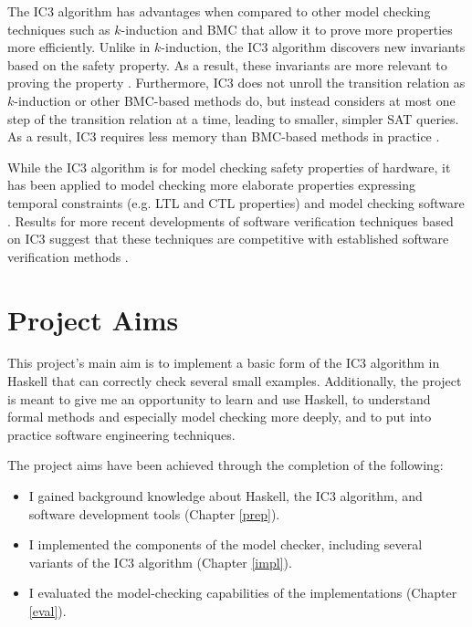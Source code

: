 \documentclass[12pt,a4paper,twoside,openright]{report}
\begin{document}
The IC3 algorithm has advantages when compared to other model checking
techniques such as $k$-induction and BMC that allow it to prove more
properties more efficiently. Unlike in $k$-induction, the IC3 algorithm
discovers new invariants based on the safety property. As a result, these
invariants are more relevant to proving the property \cite{bradley12}.
Furthermore, IC3 does not unroll the transition relation as $k$-induction
or other BMC-based methods do, but instead considers at most one step
of the transition relation at a time, leading to smaller,
simpler SAT queries. As a result, IC3 requires less memory than BMC-based
methods in practice \cite{bradley12}.


While the IC3 algorithm is for model checking safety properties of hardware,
it has been applied to model checking more
elaborate properties expressing temporal constraints (e.g. LTL and CTL
properties) and model checking software
\cite{bradley12,cimatti12}.
Results for more recent developments of software verification
techniques based on IC3 suggest that these techniques are competitive with
established software verification methods \cite{birgmeier14}.

\section{Project Aims}

This project's main aim is to implement a basic form of the IC3 algorithm in
Haskell that can correctly check several
small examples. Additionally, the project is meant to give me an opportunity
to learn and use Haskell, to understand formal methods and especially model
checking more deeply, and to put into practice software engineering techniques.

The project aims have been achieved through the completion of the following:
\begin{itemize}
\item I gained background knowledge about Haskell, the IC3 algorithm, and software
development tools (Chapter \ref{prep}).
\item I implemented the components of the model checker, including several variants of
the IC3 algorithm (Chapter \ref{impl}).
\item I evaluated the model-checking capabilities of the implementations
(Chapter \ref{eval}).
\end{itemize}
\end{document}
